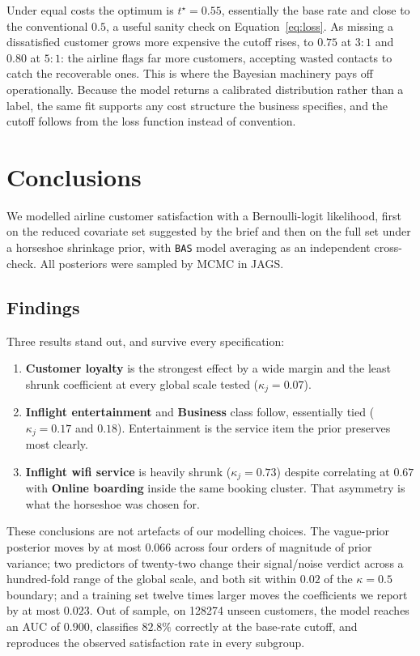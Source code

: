 Under equal costs the optimum is $t^\star = 0.55$, essentially the base rate
and close to the conventional $0.5$, a useful sanity check on
Equation~\eqref{eq:loss}. As missing a dissatisfied customer grows more
expensive the cutoff rises, to $0.75$ at $3\!:\!1$ and $0.80$ at $5\!:\!1$: the
airline flags far more customers, accepting wasted contacts to catch the
recoverable ones. This is where the Bayesian machinery pays off operationally.
Because the model returns a calibrated distribution rather than a label, the
same fit supports any cost structure the business specifies, and the cutoff
follows from the loss function instead of convention.

\section{Conclusions}
\label{sec:conclusions}
We modelled airline customer satisfaction with a Bernoulli-logit likelihood,
first on the reduced covariate set suggested by the brief and then on the full
set under a horseshoe shrinkage prior, with \texttt{BAS} model averaging as an
independent cross-check. All posteriors were sampled by MCMC in JAGS.

\subsection{Findings}
Three results stand out, and survive every specification:
\begin{enumerate}[nosep,leftmargin=*]
  \item \textbf{Customer loyalty} is the strongest effect by a wide margin and
        the least shrunk coefficient at every global scale tested
        ($\kappa_j = \mathbf{0.07}$).
  \item \textbf{Inflight entertainment} and \textbf{Business} class follow,
        essentially tied ($\kappa_j = \mathbf{0.17}$ and $\mathbf{0.18}$).
        Entertainment is the service item the prior preserves most clearly.
  \item \textbf{Inflight wifi service} is heavily shrunk
        ($\kappa_j = \mathbf{0.73}$) despite correlating at $\mathbf{0.67}$
        with \textbf{Online boarding} inside the same booking cluster. That
        asymmetry is what the horseshoe was chosen for.
\end{enumerate}

These conclusions are not artefacts of our modelling choices. The vague-prior
posterior moves by at most $0.066$ across four orders of magnitude of prior
variance; two predictors of twenty-two change their signal/noise verdict across
a hundred-fold range of the global scale, and both sit within $0.02$ of the
$\kappa = 0.5$ boundary; and a training set twelve times larger moves the
coefficients we report by at most $0.023$. Out of sample, on \num{128274}
unseen customers, the model reaches an AUC of $\mathbf{0.900}$, classifies
$\mathbf{82.8\%}$ correctly at the base-rate cutoff, and reproduces the
observed satisfaction rate in every subgroup.

